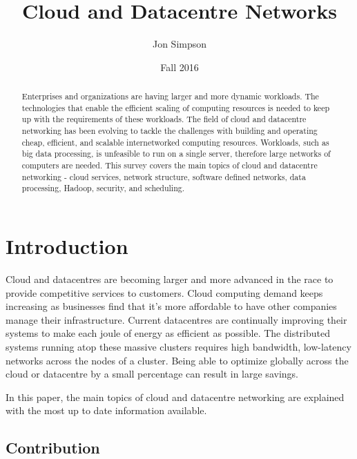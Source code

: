 \documentclass[12pt]{article}
\title{Cloud and Datacentre Networks}
\author{Jon Simpson}
\date{Fall 2016}
\begin{document}

\maketitle
\thispagestyle{empty}

\begin{abstract}
    Enterprises and organizations are having larger and more dynamic workloads. The technologies that enable the efficient scaling of computing resources is needed to keep up with the requirements of these workloads. The field of cloud and datacentre networking has been evolving to tackle the challenges with building and operating cheap, efficient, and scalable internetworked computing resources. Workloads, such as big data processing, is unfeasible to run on a single server, therefore large networks of computers are needed. This survey covers the main topics of cloud and datacentre networking - cloud services, network structure, software defined networks, data processing, Hadoop, security, and scheduling.
\end{abstract}
\newpage

\tableofcontents


\section{Introduction} \label{sec:introduction}

Cloud and datacentres are becoming larger and more advanced in the race to provide competitive services to customers. Cloud computing demand keeps increasing as businesses find that it's more affordable to have other companies manage their infrastructure. Current datacentres are continually improving their systems to make each joule of energy as efficient as possible. The distributed systems running atop these massive clusters requires high bandwidth, low-latency networks across the nodes of a cluster. Being able to optimize globally across the cloud or datacentre by a small percentage can result in large savings.

In this paper, the main topics of cloud and datacentre networking are explained with the most up to date information available.



\subsection{Contribution} \label{sub:contribution}
\end{document}
